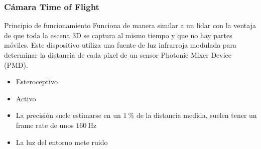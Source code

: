 \begin{frame}
    \frametitle{Cámara Time of Flight}
    
    \begin{block}{Principio de funcionamiento}
        Funciona de manera similar a un lidar con la ventaja de que toda la escena 3D se captura al mismo tiempo y que no hay partes móviles. Este dispositivo utiliza una fuente de luz infrarroja modulada para determinar la distancia de cada píxel de un sensor Photonic Mixer Device (PMD).
    \end{block}
    
    \begin{itemize}
        \item Esteroceptivo
        \item Activo
        \item La precisión suele estimarse en un $\SI{1}{\percent}$ de la distancia medida, suelen tener un frame rate de unos $\SI{160}{\hertz}$
        \item La luz del entorno mete ruido
    \end{itemize}
    
\end{frame}